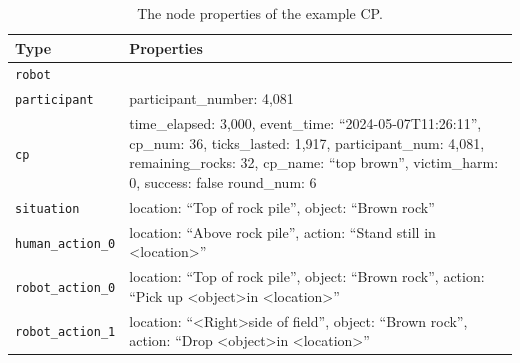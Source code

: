 \documentclass[letterpaper, 10 pt, conference]{ieeeconf}  %
\begin{document}
\begin{table}[tb]
    \centering
    \renewcommand{\arraystretch}{1.2}
    \begin{tabular}{p{2.5cm} p{5.5cm}}
        \toprule
        \textbf{Type} & \textbf{Properties} \\
        \midrule
        \texttt{robot} &  \\
        \midrule
        \texttt{participant} & participant\_number: 4,081 \\
        \midrule
        \texttt{cp} & time\_elapsed: 3,000, \newline event\_time: ``2024-05-07T11:26:11'', \newline cp\_num: 36, \newline ticks\_lasted: 1,917, \newline participant\_num: 4,081, \newline remaining\_rocks: 32, \newline cp\_name: ``top brown'', \newline victim\_harm: 0, \newline success: false \newline round\_num: 6 \\
        \midrule
        \texttt{situation} & location: ``Top of rock pile'', \newline object: ``Brown rock'' \\
        \midrule
        \texttt{human\_action\_0} & location: ``Above rock pile'', \newline action: ``Stand still in \textless location\textgreater'' \\
        \midrule
        \texttt{robot\_action\_0} & location: ``Top of rock pile'', \newline object: ``Brown rock'', \newline action: ``Pick up \textless object\textgreater in \textless location\textgreater'' \\
        \midrule
        \texttt{robot\_action\_1} & location: ``\textless Right\textgreater side of field'', \newline object: ``Brown rock'', \newline action: ``Drop \textless object\textgreater in \textless location\textgreater'' \\
        \bottomrule
    \end{tabular}
    \caption{The node properties of the example CP.}
    \label{tab:cp_properties}
\end{table}
\end{document}
